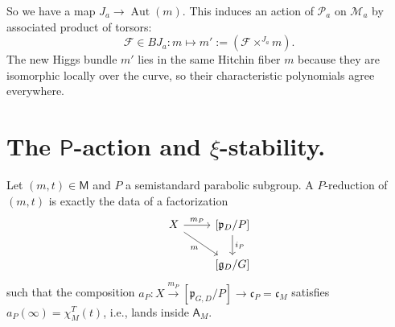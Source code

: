 \documentclass[openany]{amsbook}
\theoremstyle{definition}
\theoremstyle{remark}
\numberwithin{equation}{section}
\newcommand{\cF}{\mathcal{F}}
\newcommand{\cM}{\mathcal{M}}
\newcommand{\cP}{\mathcal{P}}
\renewcommand{\-}{\operatorname{-}}
\newcommand{\Aut}{\operatorname{Aut}}
\newcommand{\bM}{\mathsf{M}}
\newcommand{\bA}{\mathsf{A}}
\newcommand{\bP}{\mathsf{P}}
\newcommand{\fc}{\mathfrak{c}}
\newcommand{\fp}{\mathfrak{p}}
\renewcommand{\fg}{\mathfrak{g}}
\begin{document}
So we have a map $J_a \to \Aut(m)$. This induces an action of $\cP_a$ on $\cM_a$ by associated product of torsors:
$$
    \cF \in BJ_a : m \mapsto m' := (\cF \times^{J_a} m).
$$
The new Higgs bundle $m'$ lies in the same Hitchin fiber $m$ because they are isomorphic locally over the curve, so their characteristic polynomials agree everywhere.













\section{\texorpdfstring{The $\bP$-action and $\xi$-stability.}{The P-action and xi-stability.}}

Let $(m,t) \in \bM$ and $P$ a semistandard parabolic subgroup. A $P$-reduction of $(m,t)$ is exactly the data of a factorization
$$
    \begin{tikzcd}[ampersand replacement=\&]
        X \ar[r, "m_P"] \ar[dr, "m" below left] \& {[\fp_{D}/P]} \ar[d, "i_P"] \\
        \; \& {[\fg_{D}/G]}
    \end{tikzcd}
$$
such that the composition $a_P : X \xrightarrow{m_P} [\fp_{G,D}/P] \to \fc_P = \fc_M$ satisfies $a_P(\infty) = \chi_M^T(t)$, i.e., lands inside $\bA_M$.  
\end{document}
